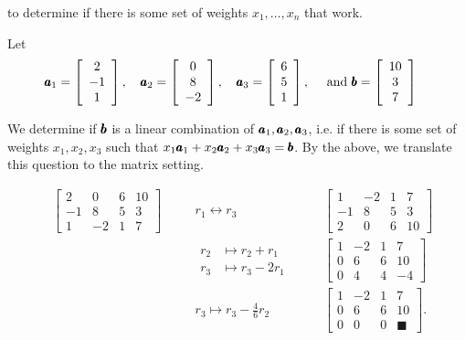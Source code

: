 to determine if there is some set of weights $x_1, \ldots, x_n$ that work.

\begin{example} Let
\[
\begin{aligned}
&\pmb{a}_1=\left[\begin{array}{c}
2 \\
-1 \\
1
\end{array}\right], \quad \pmb{a}_2=\left[\begin{array}{c}
0 \\
8 \\
-2
\end{array}\right], \quad \pmb{a}_3=\left[\begin{array}{l}
6 \\
5 \\
1
\end{array}\right], \quad \text { and } \pmb{b}=\left[\begin{array}{c}
10 \\
3 \\
7
\end{array}\right]
\end{aligned}
\]

We determine if $\pmb{b}$ is a linear combination of $\pmb{a}_1, \pmb{a}_2, \pmb{a}_3$, i.e. if there is some set of weights $x_1, x_2, x_3$ such that $x_1 \pmb{a}_1 + x_2 \pmb{a}_2 + x_3 \pmb{a}_3 = \pmb{b}$. By the above, we translate this question to the matrix setting.

\[
\begin{alignedat}{3}
& \left[\begin{array}{cccc}
2 & 0 & 6 & 10 \\
-1 & 8 & 5 & 3 \\
1 & -2 & 1 & 7
\end{array}\right]
& \quad & r_1 \leftrightarrow r_3 
& \quad & 
\left[\begin{array}{cccc}
1 & -2 & 1 & 7 \\
-1 & 8 & 5 & 3 \\
2 & 0 & 6 & 10
\end{array}\right] \\[10pt]
& & \quad & \begin{aligned}
    r_2 & \mapsto r_2 + r_1 \\
    r_3 & \mapsto r_3 - 2r_1
\end{aligned}
& \quad & 
\left[\begin{array}{cccc}
1 & -2 & 1 & 7 \\
0 & 6 & 6 & 10 \\
0 & 4 & 4 & -4
\end{array}\right] \\[10pt]
& & \quad & r_3 \mapsto r_3 - \frac{4}{6} r_2
& \quad & 
\left[\begin{array}{cccc}
1 & -2 & 1 & 7 \\
0 & 6 & 6 & 10 \\
0 & 0 & 0 & \blacksquare
\end{array}\right] .
\end{alignedat}
\]


\end{example}
